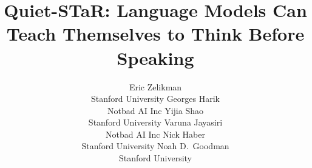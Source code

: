 \documentclass{article} %
\title{Quiet-STaR: Language Models Can Teach Themselves to Think Before Speaking}
\author{Eric Zelikman \\
Stanford University
\And
Georges Harik\\
Notbad AI Inc
\And
Yijia Shao\\
Stanford University
\And
Varuna Jayasiri\\
Notbad AI Inc
\And
Nick Haber\\
Stanford University
\And
Noah D.~Goodman\\
Stanford University
}
\begin{document}
\maketitle

\begin{abstract}

\end{abstract}
\end{document}
